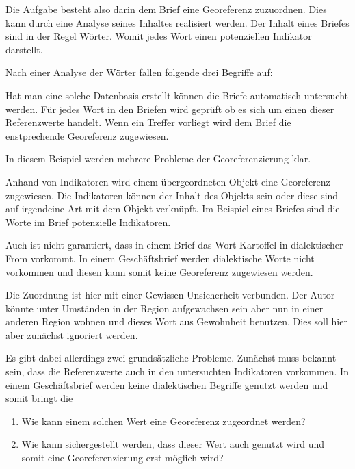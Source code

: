 				Die Aufgabe besteht also darin dem Brief eine Georeferenz zuzuordnen. 
				Dies kann durch eine Analyse seines Inhaltes realisiert werden. 
				Der Inhalt eines Briefes sind in der Regel Wörter. 
				Womit jedes Wort einen potenziellen Indikator darstellt.

				Nach einer Analyse der Wörter fallen folgende drei Begriffe auf:

				

				Hat man eine solche Datenbasis erstellt können die Briefe automatisch untersucht werden.
				Für jedes Wort in den Briefen wird geprüft ob es sich um einen dieser Referenzwerte handelt. 
				Wenn ein Treffer vorliegt wird dem Brief die enstprechende Georeferenz zugewiesen.

				In diesem Beispiel werden mehrere Probleme der Georeferenzierung klar. 

				Anhand von Indikatoren wird einem übergeordneten Objekt eine Georeferenz zugewiesen. 
				Die Indikatoren können der Inhalt des Objekts sein oder diese sind auf irgendeine Art mit dem Objekt verknüpft.
				Im Beispiel eines Briefes sind die Worte im Brief potenzielle Indikatoren.



				Auch ist nicht garantiert, dass in einem Brief das Wort Kartoffel in dialektischer From vorkommt.
				In einem Geschäftsbrief werden dialektische Worte nicht vorkommen und diesen kann somit keine Georeferenz zugewiesen werden.


				Die Zuordnung ist hier mit einer Gewissen Unsicherheit verbunden. 
				Der Autor könnte unter Umständen in der Region aufgewachsen sein aber nun in einer anderen Region wohnen und dieses Wort aus Gewohnheit benutzen.
				Dies soll hier aber zunächst ignoriert werden. 


		
		
		Es gibt dabei allerdings zwei grundsätzliche Probleme.
		Zunächst muss bekannt sein, dass die Referenzwerte auch in den untersuchten Indikatoren vorkommen.
		In einem Geschäftsbrief werden keine dialektischen Begriffe genutzt werden und somit bringt die


		\begin{enumerate}
			\item Wie kann einem solchen Wert eine Georeferenz zugeordnet werden?
			\item Wie kann sichergestellt werden, dass dieser Wert auch genutzt wird und somit eine Georeferenzierung erst möglich wird?
		\end{enumerate}




